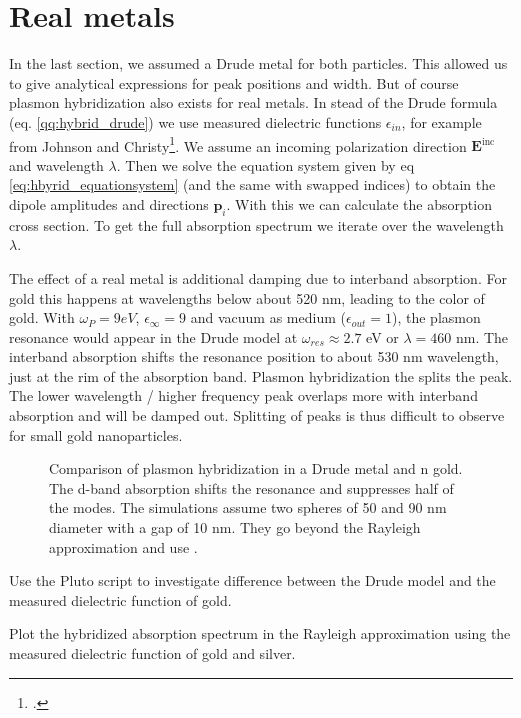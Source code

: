 \section{Real metals}

In the last section, we assumed a Drude metal for both particles. This allowed us to give analytical expressions for peak positions and width. But of course plasmon hybridization also exists for real metals. In stead of the Drude formula (eq. \ref{qq:hybrid_drude}) we use measured dielectric functions $\epsilon_{in}$, for example from Johnson and Christy\footcite{JC_gold72}. We assume an incoming polarization direction $\mathbf{E}^\text{inc}$ and wavelength $\lambda$. Then we solve the equation system given by eq \ref{eq:hbyrid_equationsystem} (and the same with swapped indices) to obtain the dipole amplitudes and directions $\mathbf{p}_i$. With this we can calculate  the absorption cross section. To get the full absorption  spectrum we iterate over the wavelength $\lambda$.


The effect of a real metal is additional damping due to interband absorption. For gold this happens at wavelengths below about 520 nm, leading to the color of gold. With $\omega_P = 9 eV$, $\epsilon_\infty = 9$ and vacuum as medium ($\epsilon_{out} = 1$), the plasmon resonance would appear in the Drude model at $\omega_{res} \approx 2.7$ eV or $\lambda = 460$ nm. The interband absorption shifts the resonance position to about 530 nm wavelength, just at the rim of the absorption band. Plasmon hybridization the splits the peak. The lower wavelength / higher frequency peak overlaps more with interband absorption and will be damped out. Splitting of peaks is thus difficult to observe for small gold nanoparticles.

\begin{figure}
\caption{Comparison of plasmon hybridization in a Drude metal and n gold. The d-band absorption shifts the resonance and suppresses half of the modes. The simulations assume two spheres of 50 and 90 nm diameter with a gap of 10 nm. They go beyond the Rayleigh approximation and use \cite{tmatrix-book06}.}
\end{figure}

\begin{questions}
\item Use the Pluto script to investigate  difference between the Drude model and the measured dielectric function of gold.

\item Plot the hybridized absorption spectrum in the Rayleigh approximation using the measured dielectric function of gold and silver.
\end{questions}



